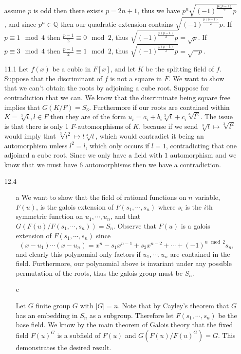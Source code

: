 \documentclass[12pt, letterpaper]{article}
\newcommand{\Q}{\mathbb{Q}}
\begin{document}
\begin{enumerate}
	assume $p$ is odd then there exists $p = 2n+1$, thus 
	we have $p^n \sqrt{(-1)^{\frac{p(p-1)}{2}} p}$, and since 
	$p^n \in \Q$ then our quadratic extension contains 
	$ \sqrt{(-1)^{\frac{p(p-1)}{2}} p}$.  If $p\equiv 1 \mod{4}$
	then $\frac{p-1}{2} \equiv 0 \mod 2$, thus 
	$ \sqrt{(-1)^{\frac{p(p-1)}{2}} p} = \sqrt{p}$.  If 
	$p\equiv 3 \mod{4}$ then $\frac{p-1}{2} \equiv 1 \mod 2$, 
	thus $ \sqrt{(-1)^{\frac{p(p-1)}{2}} p} = \sqrt{-p}$.  
	\item[11.1] Let $f(x)$ be a cubic in $F[x]$, and let 
	$K$ be the splitting field of $f$.  Suppose 
	that the discriminant of $f$ is not a square in $F$.  We 
	want to show that we can't obtain the roots by adjoining 
	a cube root.  Suppose for contradiction that we can.  
	We know that the discriminate being square free implies that
	$G(K/F) = S_3$.  Furthermore if our roots are contained 
	within $K = \sqrt[3]{l}, l \in F$ then they are of the 
	form $u_i = a_{i} + b_i\sqrt[3]{l} + c_i\sqrt[3]{l^2}$.  
	The issue is that there is only 1 $F$-automorphisms of $K$, 
	because if we send $\sqrt[3]{l} \mapsto \sqrt[3]{l^2}$ 
	would imply that $\sqrt[3]{l^2} \mapsto l\sqrt[3]{l}$, which 
	would contradict it being an automorphism unless $l^2 = l$, 
	which only occurs if $l=1$, contradicting that one adjoined a 
	cube root.  Since we only have a field with $1$ automorphism 
	and we know that we must have $6$ automorphisms then we have a 
	contradiction.  
 	
	\item[12.4] 
	\begin{enumerate}
		\item[a] We want to show that the field of 
		rational functions on $n$ variable, $F(u)$, is the galois 
		extension of $F(s_1,\cdots,s_n)$ where $s_i$ is the $i$th 
		symmetric function on $u_1,\cdots,u_n$, and that 
		$G(F(u)/F(s_1,\cdots,s_n)) = S_n$.  Observe that 
		$F(u)$ is a galois extension of $F(s_1,\cdots,s_n)$ 
		since $$(x-u_1)\cdots(x - u_n) = x^n - s_1 x^{n-1}
		+ s_2 x^{n-2} + \cdots + (-1)^{n \mod{2}} s_n,$$ and 
		clearly this polynomial only factors if $u_1,\cdots,u_n$ 
		are contained in the field.  Furthermore, our polynomial 
		above is invariant under any possible permutation of the 
		roots, thus the galois group must be $S_n$.  
		\item[c] 
		
		Let $G$ finite group $G$ with $|G| = n$.  
		Note that by Cayley's theorem that $G$ has an 
		embedding in $S_n$ as a subgroup.  Therefore let $F(s_1,\cdots,s_n)$ 
		be the base field.  We know by the main theorem of Galois 
		theory that the fixed field $F(u)^G$ is a subfield of 
		$F(u)$ and $G(F(u)/F(u)^G) = G$.  This demonstrates the 
		desired result.    
		

\end{enumerate}
\end{enumerate}
\end{document}
